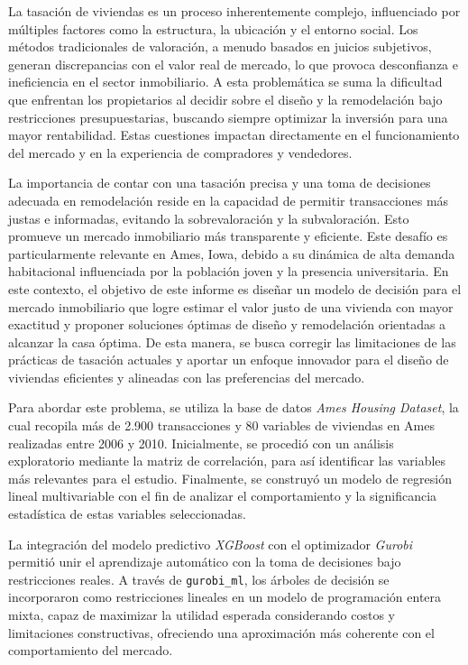 La tasación de viviendas es un proceso inherentemente complejo, influenciado por múltiples factores como la estructura, la ubicación y el entorno social. Los métodos tradicionales de valoración, a menudo basados en juicios subjetivos, generan discrepancias con el valor real de mercado, lo que provoca desconfianza e ineficiencia en el sector inmobiliario. A esta problemática se suma la dificultad que enfrentan los propietarios al decidir sobre el diseño y la remodelación bajo restricciones presupuestarias, buscando siempre optimizar la inversión para una mayor rentabilidad. Estas cuestiones impactan directamente en el funcionamiento del mercado y en la experiencia de compradores y vendedores.

La importancia de contar con una tasación precisa y una toma de decisiones adecuada en remodelación reside en la capacidad de permitir transacciones más justas e informadas, evitando la sobrevaloración y la subvaloración. Esto promueve un mercado inmobiliario más transparente y eficiente. Este desafío es particularmente relevante en Ames, Iowa, debido a su dinámica de alta demanda habitacional influenciada por la población joven y la presencia universitaria. En este contexto, el objetivo de este informe es diseñar un modelo de decisión para el mercado inmobiliario que logre estimar el valor justo de una vivienda con mayor exactitud y proponer soluciones óptimas de diseño y remodelación orientadas a alcanzar la casa óptima.
De esta manera, se busca corregir las limitaciones de las prácticas de tasación actuales y aportar un enfoque innovador para el diseño de viviendas eficientes y alineadas con las preferencias del mercado.

Para abordar este problema, se utiliza la base de datos \textit{Ames Housing Dataset}, la cual recopila más de 2.900 transacciones y 80 variables de viviendas en Ames realizadas entre 2006 y 2010. Inicialmente, se procedió con un análisis exploratorio mediante la matriz de correlación, para así identificar las variables más relevantes para el estudio. Finalmente, se construyó un modelo de regresión lineal multivariable con el fin de analizar el comportamiento y la significancia estadística de estas variables seleccionadas.

La integración del modelo predictivo \textit{XGBoost} con el optimizador \textit{Gurobi} permitió unir el aprendizaje automático con la toma de decisiones bajo restricciones reales. A través de \texttt{gurobi\_ml}, los árboles de decisión se incorporaron como restricciones lineales en un modelo de programación entera mixta, capaz de maximizar la utilidad esperada considerando costos y limitaciones constructivas, ofreciendo una aproximación más coherente con el comportamiento del mercado.

